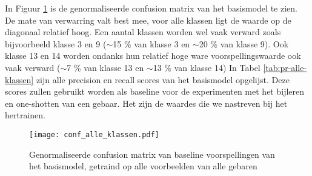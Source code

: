 \npar In Figuur \ref{fig:conf-allegebaren} is de genormaliseerde confusion matrix van het basismodel te zien. De mate van verwarring valt best mee, voor alle klassen ligt de waarde op de diagonaal relatief hoog. Een aantal klassen worden wel vaak verward zoals bijvoorbeeld klasse 3 en 9 ($\sim$15 \% van klasse 3 en $\sim$20 \% van klasse 9). Ook klasse 13 en 14 worden ondanks hun relatief hoge ware voorspellingswaarde ook vaak verward ($\sim$7 \% van klasse 13 en $\sim$13 \% van klasse 14)
\npar In Tabel \ref{tab:pr-alle-klassen} zijn alle precision en recall scores van het basismodel opgelijst. Deze scores zullen gebruikt worden als baseline voor de experimenten met het bijleren en one-shotten van een gebaar. Het zijn de waardes die we nastreven bij het hertrainen.
\begin{figure}
	\centering
	
	\texttt{[image: conf\_alle\_klassen.pdf]}
	\caption{Genormaliseerde confusion matrix van baseline voorspellingen van het basismodel, getraind op alle voorbeelden van alle gebaren }
	\label{fig:conf-allegebaren}


\end{figure}
